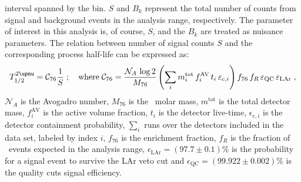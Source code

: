 interval spanned by the bin. $S$ and $B_k$ represent the total number of counts from
signal and background events in the analysis range, respectively. The parameter of
interest in this analysis is, of course, $S$, and the $B_k$ are treated as nuisance
parameters. The relation between number of signal counts $S$ and the corresponding process
half-life can be expressed as:
\begin{equation}\label{eq:2nbb-ana:halflife}
  \thalftwoM = \mathcal{C}_{76} \frac{1}{S}\;;\quad
    \text{where}\; \mathcal{C}_{76} = \frac{\mathcal{N}_A\, \log2}{M_{76}}
      \left( \sum_i m^\text{tot}_i \, f^\text{AV}_i \, t_i \,
      \epsilon_{\text{c},i} \right) f_{76} \, f_R \, \epsilon_\text{QC} \, \epsilon_\text{LAr} \;,
\end{equation}
$\mathcal{N}_A$ is the Avogadro number, $M_{76}$ is the \gesix\ molar mass, $m^\text{tot}$
is the total detector mass, $f^\text{AV}_i$ is the active volume fraction, $t_i$ is the
detector live-time, $\epsilon_{\text{c},i}$ is the detector containment probability,
$\sum_i$ runs over the detectors included in the data set, labeled by index $i$, $f_{76}$
is the enrichment fraction, $f_R$ is the fraction of \nnbb\ events expected in the
analysis range, $\epsilon_\text{LAr} = (97.7 \pm 0.1)\%$ is the probability for a signal
event to survive the LAr veto cut and $\epsilon_\text{QC} = (99.922 \pm 0.002)\%$ is the
quality cuts signal efficiency.

